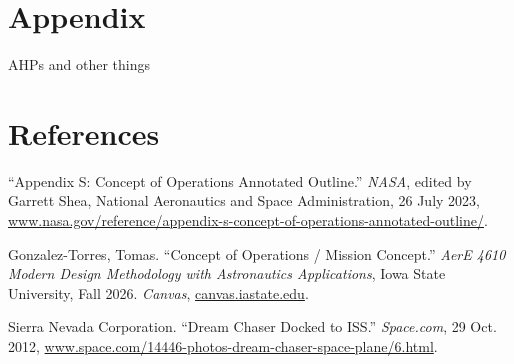 \documentclass{article}
\newcommand{\hangingcite}{\noindent\hangindent=0.5in\hangafter=1}
\begin{document}
\newpage
\section{Appendix}
AHPs and other things

\newpage
\section{References}
\vspace{0.5cm}
\hangingcite ``Appendix S: Concept of Operations Annotated Outline.'' \textit{NASA}, edited by Garrett Shea, National Aeronautics and Space Administration, 26 July 2023, \url{www.nasa.gov/reference/appendix-s-concept-of-operations-annotated-outline/}.

\vspace{0.5cm}
\hangingcite Gonzalez-Torres, Tomas. ``Concept of Operations / Mission Concept.'' \textit{AerE 4610 Modern Design Methodology with Astronautics Applications}, Iowa State University, Fall 2026. \textit{Canvas}, \url{canvas.iastate.edu}.

\vspace{0.5cm}
\hangingcite Sierra Nevada Corporation. ``Dream Chaser Docked to ISS.'' \textit{Space.com}, 29 Oct. 2012, \url{www.space.com/14446-photos-dream-chaser-space-plane/6.html}.
\end{document}
